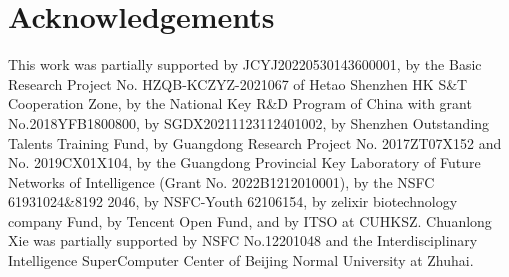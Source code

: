 \documentclass[letterpaper]{article} %
\begin{document}
 

\section*{Acknowledgements}

This work was partially supported by JCYJ20220530143600001,
by the Basic Research Project No. HZQB-KCZYZ-2021067 of Hetao Shenzhen HK S\&T Cooperation Zone, by the National Key R\&D Program of China with grant No.2018YFB1800800, by SGDX20211123112401002, by Shenzhen Outstanding Talents Training Fund, by Guangdong Research Project No. 2017ZT07X152 and No. 2019CX01X104, by the Guangdong Provincial Key Laboratory of Future Networks of Intelligence (Grant No. 2022B1212010001), by the NSFC 61931024\&8192 2046, by NSFC-Youth 62106154, by zelixir biotechnology company Fund, by Tencent Open Fund, and by ITSO at CUHKSZ. Chuanlong Xie was partially supported by NSFC No.12201048 and the Interdisciplinary Intelligence SuperComputer Center of Beijing Normal University at Zhuhai.


\nocite{*}



%
\end{document}
